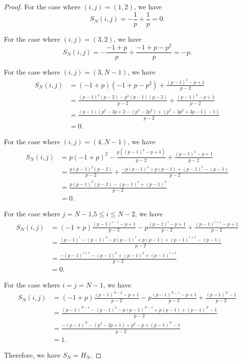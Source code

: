 \documentclass[10pt,a4paper]{amsart}
\begin{document}
\begin{proof}
For the case where $(i,j)=(1,2)$, we have
\[
S_N(i,j)=-\frac{1}{p}+\frac{1}{p}=0.
\]

For the case where $(i,j)=(3,2)$, we have
\[
S_N(i,j)=-\frac{-1+p}{p}+\frac{-1+p-p^2}{p}=-p.
\]

For the case where $(i,j)=(3,N-1)$, we have
\begin{align*}
S_N(i,j)&=(-1+p)(-1+p-p^2)+\frac{(p-1)^4-p+1}{p-2}\\
&=\frac{(p-1)^2(p-2)-p^2(p-1)(p-2)}{p-2}+\frac{(p-1)^4-p+1}{p-2}\\
&=\frac{(p-1)(p^2-3p+2-(p^3-2p^2)+(p^3-3p^2+3p-1)-1)}{p-2}\\
&=0.
\end{align*}

For the case where $(i,j)=(4,N-1)$, we have
\begin{align*}
S_N(i,j)&=p(-1+p)^2-\frac{p((p-1)^4-p+1)}{p-2}+\frac{(p-1)^5-p+1}{p-2}\\
&=\frac{p(p-1)^2(p-2)}{p-2}+\frac{-p(p-1)^4+p(p-1)+(p-1)^5-(p-1)}{p-2}\\
&=\frac{p(p-1)^2(p-2)-(p-1)^4+(p-1)^2}{p-2}\\
&=0.
\end{align*}

For the case where $j=N-1$,\;$5\leq i\leq N-2$, we have
\begin{align*}
S_N(i,j)&=(-1+p)\frac{(p-1)^{i-1}-p+1}{p-2}-p\frac{(p-1)^i-p+1}{p-2}+\frac{(p-1)^{i+1}-p+1}{p-2}\\
&=\frac{(p-1)^i-(p-1)^2-p(p-1)^i+p(p-1)+(p-1)^{i+1}-(p-1)}{p-2}\\
&=\frac{-(p-1)^{i+1}-(p-1)^2+(p-1)^2+(p-1)^{i+1}}{p-2}\\
&=0.
\end{align*}

For the case where $i=j=N-1$, we have
\begin{align*}
S_N(i,j)&=(-1+p)\frac{(p-1)^{N-2}-p+1}{p-2}-p\frac{(p-1)^{N-1}-p+1}{p-2}+\frac{(p-1)^N-1}{p-2}\\
&=\frac{(p-1)^{N-1}-(p-1)^2-p(p-1)^{N-1}+p(p-1)+(p-1)^N-1}{p-2}\\
&=\frac{-(p-1)^N-(p^2-2p+1)+p^2-p+(p-1)^N-1}{p-2}\\
&=1.
\end{align*}

Therefore, we have $S_N=H_N$.
\end{proof}
\end{document}
